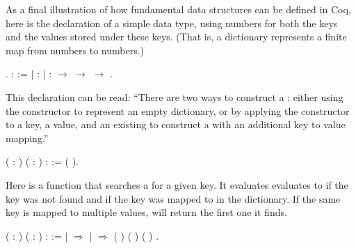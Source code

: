 \documentclass[12pt]{report}
\begin{document}
 As a final illustration of how fundamental data structures
    can be defined in Coq, here is the declaration of a simple
     data type, using numbers for both the keys and the
    values stored under these keys.  (That is, a dictionary represents
    a finite map from numbers to numbers.) \begin{coqdoccode}
\coqdocemptyline
\coqdocnoindent
{} .\coqdoceol
\coqdocemptyline
\coqdocnoindent
{}  :  :=\coqdoceol
\coqdocindent{1.00em}
\ensuremath{|}   :  \coqdoceol
\coqdocindent{1.00em}
\ensuremath{|}  :  \ensuremath{\rightarrow}  \ensuremath{\rightarrow}  \ensuremath{\rightarrow} .\coqdoceol
\coqdocemptyline
\end{coqdoccode}
This declaration can be read: ``There are two ways to construct a
    : either using the constructor  to represent an
    empty dictionary, or by applying the constructor  to
    a key, a value, and an existing  to construct a
     with an additional key to value mapping.'' \begin{coqdoccode}
\coqdocemptyline
\coqdocnoindent
{}  (  : ) ( : ) :  :=\coqdoceol
\coqdocindent{1.00em}
(   ).\coqdoceol
\coqdocemptyline
\end{coqdoccode}
Here is a function  that searches a  for a
    given key.  It evaluates evaluates to  if the key was not
    found and   if the key was mapped to  in the
    dictionary. If the same key is mapped to multiple values, 
    will return the first one it finds. \begin{coqdoccode}
\coqdocemptyline
\coqdocnoindent
{}  ( : ) ( : ) :  := \coqdoceol
\coqdocindent{1.00em}
   \coqdoceol
\coqdocindent{1.00em}
\ensuremath{|}          \ensuremath{\Rightarrow} \coqdoceol
\coqdocindent{1.00em}
\ensuremath{|}     \ensuremath{\Rightarrow}  (  ) \coqdoceol
\coqdocindent{11.50em}
 ( ) \coqdoceol
\coqdocindent{11.50em}
 (  )\coqdoceol
\coqdocindent{1.00em}
.\coqdoceol
\coqdocemptyline
\end{coqdoccode}
\end{document}
